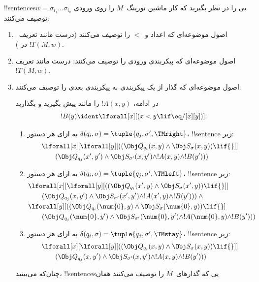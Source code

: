 \documentclass[../../../include/open-logic-section]{subfiles}
\begin{document}
!!{sentence}sیی را در نظر بگیرید که کار ماشین تورینگ~$M$ را روی ورودی
$w=\sigma_{i_1}\dots\sigma_{i_k}$ توصیف می‌کنند:
\begin{enumerate}
\item اصول موضوعه‌ای که اعداد و~$<$ را توصیف می‌کنند (درست مانند
تعریف~$!T(M,w)$ در ).
\item اصول موضوعه‌ای که پیکربندی ورودی را توصیف می‌کنند: درست مانند
تعریف~$!T(M,w)$.
\item اصول موضوعه‌ای که گذار از یک پیکربندی به پیکربندی بعدی را توصیف
  می‌کنند:

در ادامه، $!A(x,y)$ را مانند پیش بگیرید و بگذارید
\[
  !B(y) \ident \lforall[x][(x < y \lif \eq/[x][y])].
\]
\begin{enumerate}
\item {} به ازای هر دستور
  $\delta(q_i,\sigma)=\tuple{q_j,\sigma',\TMright}$، !!{sentence}ٔ زیر:
\begin{align*}
& \lforall[x][\lforall[y][(
   (\Obj Q_{q_i}(x, y) \land \Obj S_{\sigma}(x, y)) \lif {}]] \\
&\qquad   (\Obj Q_{q_j}(x', y') \land \Obj S_{\sigma'}(x, y') \land
!A(x, y) \land !B(y')))
\end{align*}
\item {} به ازای هر دستور
  $\delta(q_i,\sigma)=\tuple{q_j,\sigma',\TMleft}$، !!{sentence}ٔ زیر:
\begin{align*}
& \lforall[x][\lforall[y][
    ((\Obj Q_{q_i}(x', y) \land \Obj S_{\sigma}(x', y)) \lif {}]]\\
& \qquad   (\Obj Q_{q_j}(x, y') \land \Obj S_{\sigma'}(x', y') \land
!A(x', y) \land !B(y'))) \land {}\\
& \lforall[y][((\Obj Q_{q_i}(\num{0}, y) \land \Obj S_{\sigma}(\num{0},
    y)) \lif {}]\\
& \qquad (\Obj Q_{q_j}(\num{0}, y') \land \Obj S_{\sigma'}(\num{0},
  y') \land !A(\num{0}, y) \land !B(y')))
\end{align*}
\item {} به ازای هر دستور
  $\delta(q_i,\sigma)=\tuple{q_j,\sigma',\TMstay}$، !!{sentence}ٔ زیر:
\begin{align*}
& \lforall[x][\lforall[y][(
   (\Obj Q_{q_i}(x, y) \land \Obj S_{\sigma}(x, y)) \lif {}]] \\
&\qquad (\Obj Q_{q_j}(x, y') \land \Obj S_{\sigma'}(x, y') \land
!A(x, y) \land !B(y')))
\end{align*}
\end{enumerate}
چنان‌که می‌بینید، !!{sentence}sیی که گذارهای~$M$ را توصیف می‌کنند همان

\end{enumerate}
\end{document}
